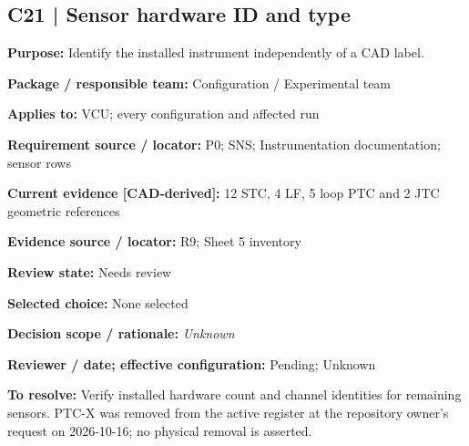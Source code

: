 \documentclass[11pt]{article}
\begin{document}
\par\noindent\begin{minipage}{\textwidth}\small\setlength{\parskip}{2pt}
\subsection*{C21 | Sensor hardware ID and type}
\textbf{Purpose:} Identify the installed instrument independently of a CAD label.\par
\textbf{Package / responsible team:} Configuration / Experimental team\par
\textbf{Applies to:} VCU; every configuration and affected run\par
\textbf{Requirement source / locator:} P0; SNS; Instrumentation documentation; sensor rows\par
\textbf{Current evidence [CAD-derived]:} 12 STC, 4 LF, 5 loop PTC and 2 JTC geometric references\par
\textbf{Evidence source / locator:} R9; Sheet 5 inventory\par
\textbf{Review state:} Needs review\par
\textbf{Selected choice:} None selected\par
\textbf{Decision scope / rationale:} \textit{Unknown}\par
\textbf{Reviewer / date; effective configuration:} Pending; Unknown\par
\textbf{To resolve:} Verify installed hardware count and channel identities for remaining sensors. PTC-X was removed from the active register at the repository owner's request on 2026-10-16; no physical removal is asserted.\par
\end{minipage}\par\vspace{5pt}
\end{document}
